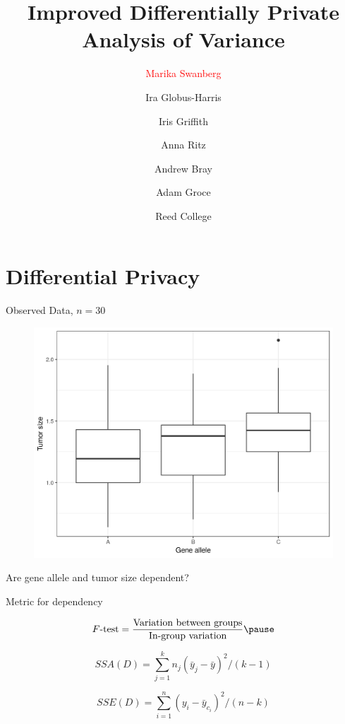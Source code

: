 \documentclass{beamer}
\title[Improved Private ANOVA]{Improved Differentially Private Analysis of Variance}
\author[Marika Swanberg]{\textcolor{red}{Marika Swanberg} \and Ira Globus-Harris \and Iris Griffith \and \newline Anna Ritz \and  Andrew Bray \and Adam Groce}
\date{Reed College}
\newcommand{\sse}{\textit{SSE}\xspace}
\newcommand{\ssa}{\textit{SSA}\xspace}
\begin{document}
\begin{frame}
\titlepage
\end{frame}


\section{Differential Privacy}

\begin{frame}{Observed Data, $n=30$}
\begin{figure}
  \includegraphics[scale=0.5]{simulation/observed-plot}
\end{figure}
\pause
Are gene allele and tumor size dependent?
\end{frame}

\begin{frame}{Metric for dependency}

\begin{equation*}
F\text{-test} = \frac{\text{Variation between groups}}{\text{In-group variation}} \pause 
\end{equation*}

\begin{equation*}
\ssa(D) = \sum_{j=1}^{k} n_j (\bar{y}_j - \bar{y})^2/(k-1)
\end{equation*}

\begin{equation*}
\sse(D) = \sum_{i=1}^{n}  (y_{i}-\bar{y}_{c_i})^2/(n-k)
\end{equation*}
\end{frame}
\end{document}
